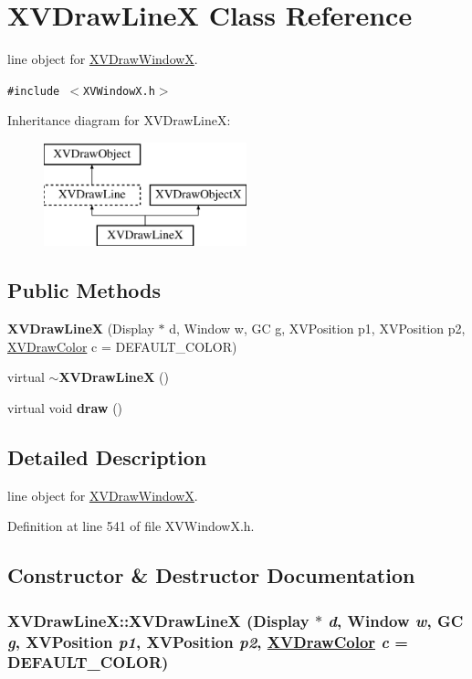 \hypertarget{class_XVDrawLineX}{
\section{XVDraw\-Line\-X  Class Reference}
\label{XVDrawLineX}
}
line object for \hyperlink{class_XVDrawWindowX}{XVDraw\-Window\-X}. 


{\tt \#include $<$XVWindow\-X.h$>$}

Inheritance diagram for XVDraw\-Line\-X:\begin{figure}[H]
\begin{center}
\leavevmode
\includegraphics[height=3cm]{class_XVDrawLineX}
\end{center}
\end{figure}
\subsection*{Public Methods}
\begin{CompactItemize}
\item 
{\bf XVDraw\-Line\-X} (Display $\ast$ d, Window w, GC g, XVPosition p1, XVPosition p2, \hyperlink{class_XVDrawColor}{XVDraw\-Color} c = DEFAULT\_\-COLOR)
\item 
virtual {\bf $\sim$XVDraw\-Line\-X} ()
\item 
virtual void {\bf draw} ()
\end{CompactItemize}


\subsection{Detailed Description}
line object for \hyperlink{class_XVDrawWindowX}{XVDraw\-Window\-X}.





Definition at line 541 of file XVWindow\-X.h.

\subsection{Constructor \& Destructor Documentation}
\label{XVDrawLineX_a0}
\hypertarget{class_XVDrawLineX_a0}{
\subsubsection[XVDrawLineX]{\setlength{\rightskip}{0pt plus 5cm}XVDraw\-Line\-X::XVDraw\-Line\-X (Display $\ast$ {\em d}, Window {\em w}, GC {\em g}, XVPosition {\em p1}, XVPosition {\em p2}, \hyperlink{class_XVDrawColor}{XVDraw\-Color} {\em c} = DEFAULT\_\-COLOR)}}




